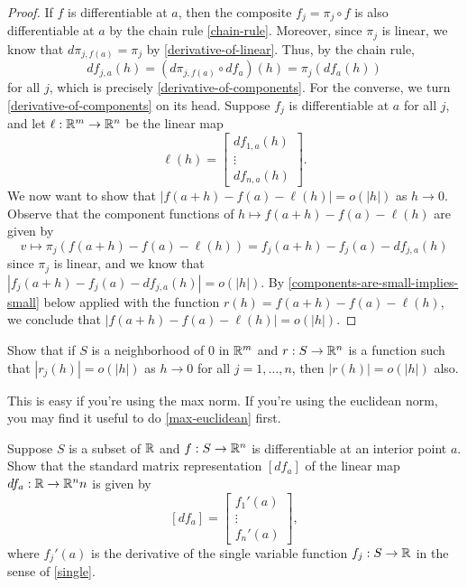 \begin{proof}
	If $f$ is differentiable at $a$, then the composite $f_j = \pi_j \circ f$ is also differentiable at $a$ by the chain rule \ref{chain-rule}. Moreover, since $\pi_j$ is linear, we know that $d\pi_{j,f(a)} = \pi_j$ by \cref{derivative-of-linear}. Thus, by the chain rule, 
	\[ df_{j,a}(h) = (d\pi_{j,f(a)} \circ df_a)(h) = \pi_j(df_a(h)) \]
	for all $j$, which is precisely \cref{derivative-of-components}. 
	For the converse, we turn \cref{derivative-of-components} on its head. Suppose $f_j$ is differentiable at $a$ for all $j$, and let $\ell : \mathbb{R}^m \to \mathbb{R}^n$ be the linear map 
	\[ \ell(h) = \begin{bmatrix} df_{1,a}(h) \\ \vdots \\ df_{n,a}(h) \end{bmatrix}.  \]
	We now want to show that $|f(a+h)-f(a)-\ell(h)| = o(|h|)$ as $h \to 0$. Observe that the component functions of $h \mapsto f(a+h)-f(a)-\ell(h)$ are given by
	\[ v \mapsto \pi_j \left( f(a+h)-f(a)-\ell(h) \right) = f_j(a+h)-f_j(a)-df_{j,a}(h) \]
	since $\pi_j$ is linear, 
	and we know that $|f_j(a+h)-f_j(a)-df_{j,a}(h)| = o(|h|)$. By \cref{components-are-small-implies-small} below applied with the function $r(h) = f(a+h)-f(a)-\ell(h)$, we conclude that $|f(a+h)-f(a)-\ell(h)| = o(|h|)$. 
\end{proof}

\begin{exercise} \label{components-are-small-implies-small}
	Show that if $S$ is a neighborhood of 0 in $\mathbb{R}^m$ and $r :  S  \to \mathbb{R}^n$ is a function such that $|r_j(h)| = o(|h|)$ as $h \to 0$ for all $j = 1, \dotsc, n$, then $|r(h)| = o(|h|)$ also.
	\begin{hint}
		This is easy if you're using the max norm. If you're using the euclidean norm, you may find it useful to do \cref{max-euclidean} first. 
	\end{hint}
\end{exercise}

\begin{exercise}
	Suppose $S$ is a subset of $\mathbb{R}$ and $f : S \to \mathbb{R}^n$ is differentiable at an interior point $a$. Show that the standard matrix representation $[df_a]$ of the linear map $df_a : \mathbb{R} \to \mathbb{R}^nn$ is given by 
	\[ [df_a] = \begin{bmatrix} f_1'(a) \\ \vdots \\ f_n'(a) \end{bmatrix}, \]
	where $f_j'(a)$ is the derivative of the single variable function $f_j : S \to \mathbb{R}$ in the sense of \cref{single}. 
\end{exercise}

